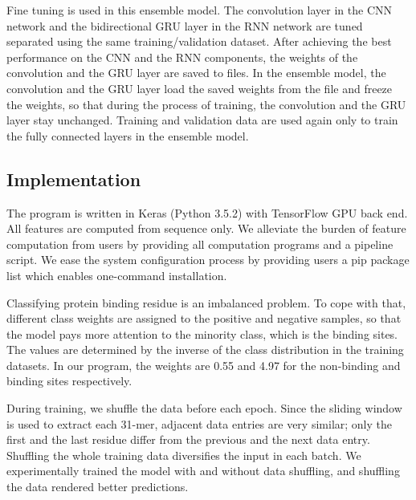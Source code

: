 \documentclass{bioinfo}
\begin{document}
\begin{methods}
Fine tuning is used in this ensemble model. The convolution layer in the CNN network and the bidirectional GRU layer in the RNN network are tuned separated using the same training/validation dataset. After achieving the best performance on the CNN and the RNN components, the weights of the convolution and the GRU layer are saved to files. In the ensemble model, the convolution and the GRU layer load the saved weights from the file and freeze the weights, so that during the process of training, the convolution and the GRU layer stay unchanged. Training and validation data are used again only to train the fully connected layers in the ensemble model.

\subsection{Implementation}
The program is written in Keras \citep{chollet2015keras} (Python 3.5.2) with TensorFlow GPU \citep{tensorflow2015-whitepaper} back end. All features are computed from sequence only. We alleviate the burden of feature computation from users by providing all computation programs and a pipeline script. We ease the system configuration process by providing users a pip package list which enables one-command installation. 

Classifying protein binding residue is an imbalanced problem. To cope with that, different class weights \citep{ting2002instance} are assigned to the positive and negative samples, so that the model pays more attention to the minority class, which is the binding sites.  The values are determined by the inverse of the class distribution in the training datasets. In our program, the weights are 0.55 and 4.97 for the non-binding and binding sites respectively. 

During training, we shuffle the data before each epoch. Since the sliding window is used to extract each 31-mer, adjacent data entries are very similar; only the first and the last residue differ from the previous and the next data entry. Shuffling the whole training data diversifies the input in each batch. We experimentally trained the model with and without data shuffling, and shuffling the data rendered better predictions. 


\end{methods}
\end{document}
